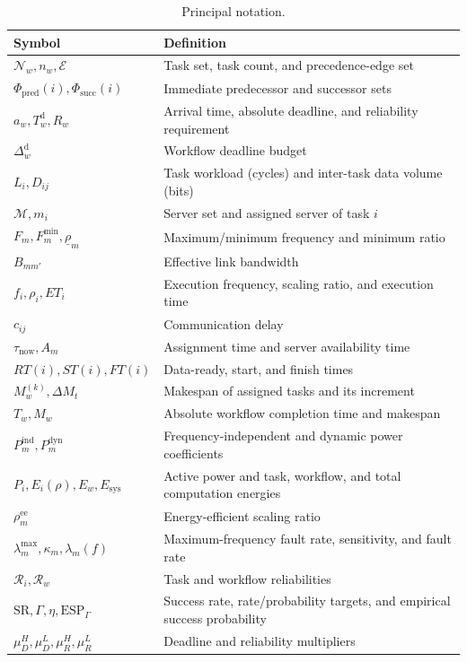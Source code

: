 \documentclass[journal]{IEEEtran}
\begin{document}
\begin{table}[t]
\centering
\caption{Principal notation.}
\label{tab:notation}
\renewcommand{\arraystretch}{1.08}
\begin{tabular}{@{}p{}p{}@{}}
\toprule
Symbol & Definition \\
\midrule
$\mathcal N_w,n_w,\mathcal E$ & Task set, task count, and precedence-edge set \\
$\Phi_{\mathrm{pred}}(i),\Phi_{\mathrm{succ}}(i)$
    & Immediate predecessor and successor sets \\
$a_w,T_w^{\mathrm d},R_w$
    & Arrival time, absolute deadline, and reliability requirement \\
$\Delta_w^{\mathrm d}$ & Workflow deadline budget \\
$L_i,D_{ij}$
    & Task workload (cycles) and inter-task data volume (bits) \\
$\mathcal M,m_i$
    & Server set and assigned server of task $i$ \\
$F_m,F_m^{\min},\underline\rho_m$
    & Maximum/minimum frequency and minimum ratio \\
$B_{mm'}$ & Effective link bandwidth \\
$f_i,\rho_i,ET_i$
    & Execution frequency, scaling ratio, and execution time \\
$c_{ij}$ & Communication delay \\
$\tau_{\mathrm{now}},A_m$
    & Assignment time and server availability time \\
$RT(i),ST(i),FT(i)$
    & Data-ready, start, and finish times \\
$M_w^{(k)},\Delta M_t$
    & Makespan of assigned tasks and its increment \\
$T_w,M_w$ & Absolute workflow completion time and makespan \\
$P_m^{\mathrm{ind}},P_m^{\mathrm{dyn}}$
    & Frequency-independent and dynamic power coefficients \\
$P_i,E_i(\rho),E_w,E_{\mathrm{sys}}$
    & Active power and task, workflow, and total computation energies \\
$\rho_m^{\mathrm{ee}}$ & Energy-efficient scaling ratio \\
$\lambda_m^{\max},\kappa_m,\lambda_m(f)$
    & Maximum-frequency fault rate, sensitivity, and fault rate \\
$\mathcal R_i,\mathcal R_w$
    & Task and workflow reliabilities \\
$\mathrm{SR},\Gamma,\eta,\mathrm{ESP}_{\Gamma}$
    & Success rate, rate/probability targets, and empirical success probability \\
$\mu_D^H,\mu_D^L,\mu_R^H,\mu_R^L$
    & Deadline and reliability multipliers \\
\bottomrule
\end{tabular}
\end{table}
\end{document}
